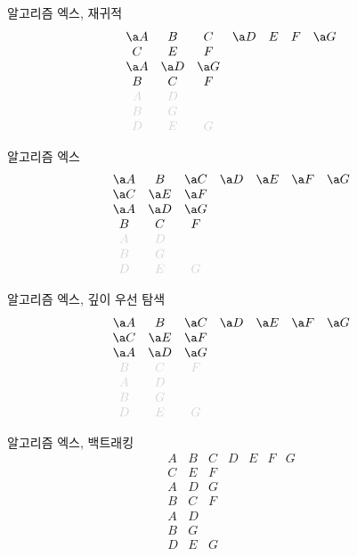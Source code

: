 \documentclass[xcolor=svgnames]{beamer}
\begin{document}
%
\begin{frame}{알고리즘 엑스, 재귀적}
\Large\boldmath
  $$
  \begin{array}{ccccccc}
    \a A & B & C & \a D & E & F & \a G\\
    C & E & F &&&&\\
    \a A & \a D & \a G &&&&\\
    B & C & F &&&&\\
    \g A & \g D &&&&&\\
    \g B & \g G &&&&&\\
    \g D & \g E & \g G &&&&
  \end{array}
  $$
\end{frame}

%
\begin{frame}{알고리즘 엑스}
\Large\boldmath
  $$
  \begin{array}{ccccccc}
    \a A & B & \a C & \a D & \a E & \a F & \a G\\
    \a C & \a E & \a F &&&&\\
    \a A & \a D & \a G &&&&\\
    B & C & F &&&&\\
    \g A & \g D &&&&&\\
    \g B & \g G &&&&&\\
    \g D & \g E & \g G &&&&
  \end{array}
  $$
\end{frame}

%
\begin{frame}{알고리즘 엑스, 깊이 우선 탐색}
  \Large\boldmath
  $$
  \begin{array}{ccccccc}
    \a A & B & \a C & \a D & \a E & \a F & \a G\\
    \a C & \a E & \a F &&&&\\
    \a A & \a D & \a G &&&&\\
    \g B & \g C & \g F &&&&\\
    \g A & \g D &&&&&\\
    \g B & \g G &&&&&\\
    \g D & \g E & \g G &&&&
  \end{array}
  $$
\end{frame}

%
\begin{frame}{알고리즘 엑스, 백트래킹}
\Large\boldmath
  $$
  \begin{array}{ccccccc}
    A & B & C & D & E & F & G\\
    C & E & F &&&&\\
    A & D & G &&&&\\
    B & C & F &&&&\\
    A & D &&&&&\\
    B & G &&&&&\\
    D & E & G &&&&
  \end{array}
  $$
\end{frame}
\end{document}
